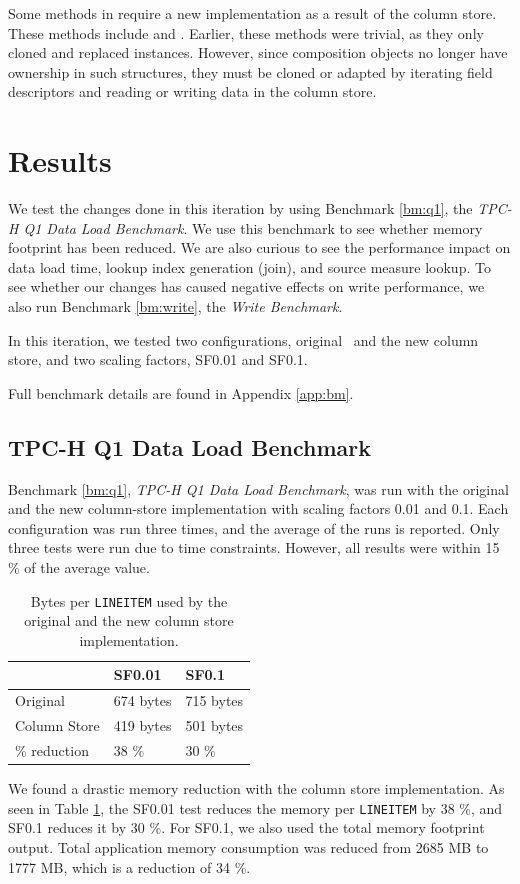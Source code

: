 Some methods in  require a new implementation as a result of the column store. These methods include  and . Earlier, these methods were trivial, as they only cloned and replaced  instances. However, since composition objects no longer have ownership in such structures, they must be cloned or adapted by iterating field descriptors and reading or writing data in the column store.

\section{Results}
\label{sec:Results}
We test the changes done in this iteration by using Benchmark \ref{bm:q1}, the \textit{TPC-H Q1 Data Load Benchmark}. We use this benchmark to see whether memory footprint has been reduced. We are also curious to see the performance impact on data load time, lookup index generation (join), and source measure lookup. To see whether our changes has caused negative effects on write performance, we also run Benchmark \ref{bm:write}, the \textit{Write Benchmark}. 

In this iteration, we tested two configurations, original \gap~and the new column store, and two scaling factors, SF0.01 and SF0.1.

Full benchmark details are found in Appendix \ref{app:bm}.

\subsection{TPC-H Q1 Data Load Benchmark}
\label{column-store:q1}
Benchmark \ref{bm:q1}, \textit{TPC-H Q1 Data Load Benchmark}, was run with the original and the new column-store implementation with scaling factors 0.01 and 0.1. Each configuration was run three times, and the average of the runs is reported. Only three tests were run due to time constraints. However, all results were within 15 \% of the average value.

\begin{table}
    \centering
    \begin{tabularx}{0.75\textwidth}{X | X X}
        & SF0.01 & SF0.1 \\ 
        \hline
        \hline
        Original & 674 bytes & 715 bytes \\
        Column Store & 419 bytes & 501 bytes \\
        \% reduction & 38 \% & 30 \% \\
    \end{tabularx}
    \caption{Bytes per \texttt{LINEITEM} used by the original and the new column store implementation.} 
    \label{tab:non-blackbox-bpl}
\end{table}
We found a drastic memory reduction with the column store implementation. As seen in Table \ref{tab:non-blackbox-bpl}, the SF0.01 test reduces the memory per \texttt{LINEITEM} by 38 \%, and SF0.1 reduces it by 30 \%. For SF0.1, we also used the total memory footprint output. Total application memory consumption was reduced from 2685 MB to 1777 MB, which is a reduction of 34 \%.

